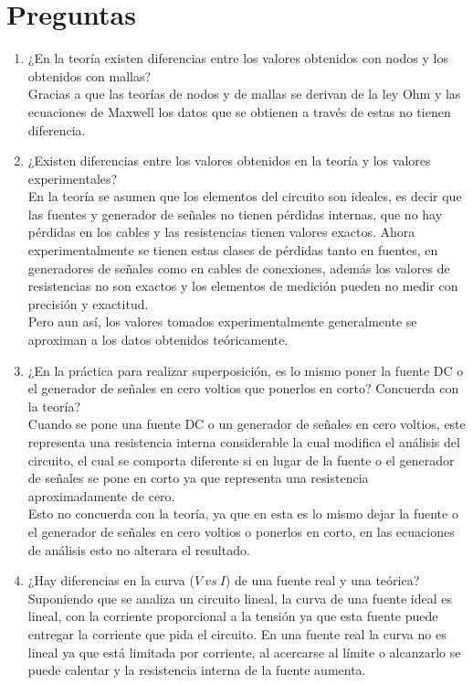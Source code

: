 \documentclass[twocolumn]{IEEEtran}
\begin{document}
\section{Preguntas}
\begin{enumerate}
 \item ¿En la teoría existen diferencias entre los valores obtenidos con nodos y los obtenidos
con mallas?\\
Gracias a que las teorías de nodos y de mallas se derivan de la ley  Ohm y las ecuaciones de Maxwell los datos que se obtienen a través de estas  no tienen diferencia.
 \item ¿Existen diferencias entre los valores obtenidos en la teoría y los valores experimentales?\\
En la teoría se asumen que los elementos del circuito son ideales, es decir que las fuentes y generador de señales no tienen pérdidas internas, que no hay pérdidas en los cables y las resistencias tienen valores exactos. Ahora experimentalmente se tienen estas clases de pérdidas tanto en fuentes, en generadores de señales  como en cables de conexiones, además los valores de resistencias no son exactos y los elementos de medición pueden no medir con precisión y exactitud.\\
Pero aun así, los valores tomados experimentalmente generalmente se aproximan a los datos obtenidos teóricamente.
 \item ¿En la práctica para realizar superposición, es lo mismo poner la fuente DC o el generador de señales en cero voltios que ponerlos en corto?  Concuerda con la teoría?\\
Cuando se pone una fuente DC o un generador de señales en cero voltios, este representa una resistencia interna considerable la cual modifica el análisis del circuito, el cual se comporta diferente si en lugar de la fuente o el generador de señales  se pone en corto ya que representa una resistencia aproximadamente de  cero.\\
Esto no concuerda con la teoría, ya que en esta es lo mismo dejar la fuente o el generador de señales en cero voltios o ponerlos en corto, en las ecuaciones de análisis esto no alterara el resultado.
 \item ¿Hay diferencias en la curva ($V \ vs \ I$) de una fuente real y una teórica?\\
Suponiendo que se analiza un circuito lineal, la curva de una fuente ideal es lineal, con la corriente proporcional a la tensión ya que esta fuente puede entregar la corriente que pida el circuito. En una fuente real la curva no es lineal ya que está limitada por corriente, al acercarse al límite  o alcanzarlo se puede calentar y la resistencia interna de la fuente aumenta. 

\end{enumerate}
\end{document}
